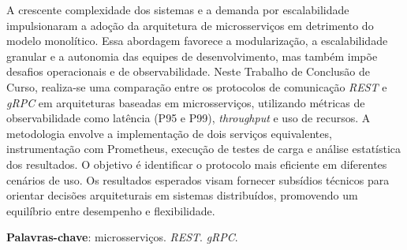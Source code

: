 \setlength{\absparsep}{18pt} %
\begin{resumo}
	\SingleSpacing
	A crescente complexidade dos sistemas e a demanda por escalabilidade impulsionaram a adoção da arquitetura de microsserviços em detrimento do modelo monolítico. Essa abordagem favorece a modularização, a escalabilidade granular e a autonomia das equipes de desenvolvimento, mas também impõe desafios operacionais e de observabilidade. Neste Trabalho de Conclusão de Curso, realiza-se uma comparação entre os protocolos de comunicação \textit{REST} e \textit{gRPC} em arquiteturas baseadas em microsserviços, utilizando métricas de observabilidade como latência (P95 e P99), \textit{throughput} e uso de recursos. A metodologia envolve a implementação de dois serviços equivalentes, instrumentação com Prometheus, execução de testes de carga e análise estatística dos resultados. O objetivo é identificar o protocolo mais eficiente em diferentes cenários de uso. Os resultados esperados visam fornecer subsídios técnicos para orientar decisões arquiteturais em sistemas distribuídos, promovendo um equilíbrio entre desempenho e flexibilidade.
	
	\textbf{Palavras-chave}: microsserviços. \textit{REST}. \textit{gRPC}.
\end{resumo}